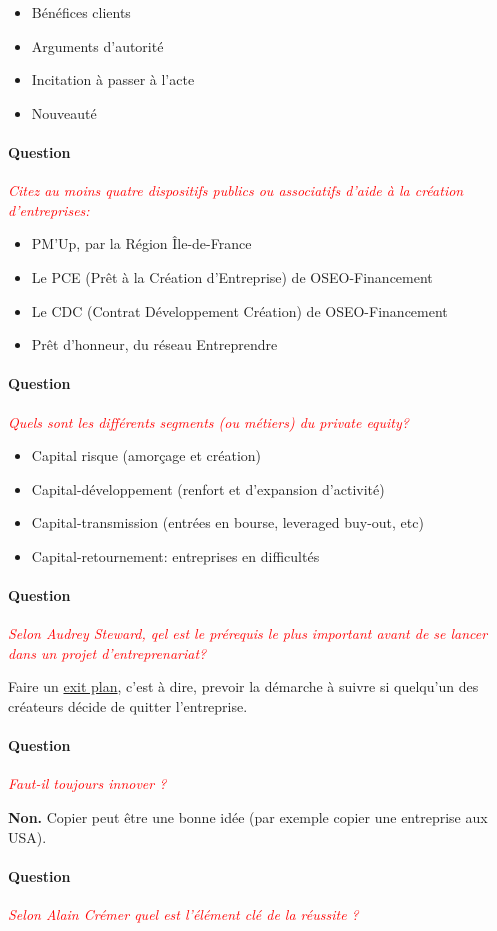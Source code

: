 \documentclass[12pt,oneside,a4paper]{article}
\newcommand{\question}[1]
{
\addtocounter{section}{1}
\paragraph*{Question \thesection}
\emph{\textcolor{red}{#1}}
}
\begin{document}
\begin{itemize}[label=]
	\item Bénéfices clients
	\item Arguments d’autorité
	\item Incitation à passer à l’acte
	\item Nouveauté	
\end{itemize}
\question{Citez au moins quatre dispositifs publics ou associatifs d'aide à la création d'entreprises:}

\begin{itemize}[label=]
    \item PM'Up, par la Région Île-de-France
    \item Le PCE (Prêt à la Création d'Entreprise) de OSEO-Financement
    \item Le CDC (Contrat Développement Création) de OSEO-Financement
    \item Prêt d'honneur, du réseau Entreprendre
\end{itemize}

\question{Quels sont les différents segments (ou métiers) du private equity?}

\begin{itemize}[label=]
	\item Capital risque (amorçage et création)
    \item Capital-développement (renfort et d'expansion d'activité)
    \item Capital-transmission (entrées en bourse, leveraged buy-out, etc)
    \item Capital-retournement: entreprises en difficultés
\end{itemize}

\question{Selon Audrey Steward, qel est le prérequis le plus important avant de se lancer dans un projet d'entreprenariat?}

Faire un \underline{exit plan}, c'est à dire, prevoir la démarche à suivre si quelqu'un des créateurs décide de quitter l'entreprise.
\question{Faut-il toujours innover ?}

\textbf{Non.} Copier peut être une bonne idée (par exemple copier une entreprise aux USA).
\question{Selon Alain Crémer quel est l'élément clé de la réussite ?}
\end{document}
